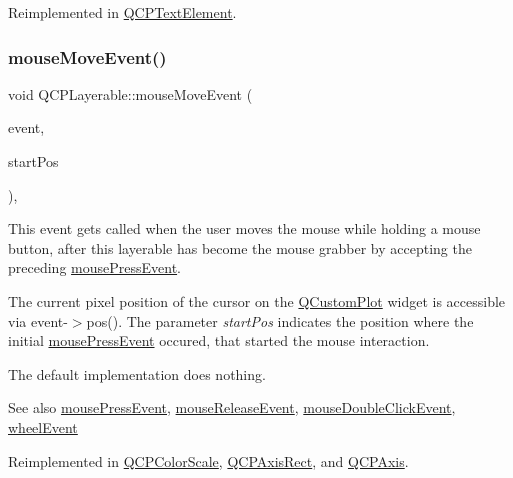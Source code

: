 Reimplemented in \hyperlink{classQCPTextElement_a2272ff775ab385f612e9fd39773de7c0}{Q\+C\+P\+Text\+Element}.

\mbox{\label{classQCPLayerable_a9eee1ba47fd69be111059ca3881933e4}} 
\subsubsection{\texorpdfstring{mouse\+Move\+Event()}{mouseMoveEvent()}}
{\footnotesize\ttfamily void Q\+C\+P\+Layerable\+::mouse\+Move\+Event (\begin{DoxyParamCaption}\item[{Q\+Mouse\+Event $\ast$}]{event,  }\item[{const Q\+PointF \&}]{start\+Pos }\end{DoxyParamCaption})\hspace{0.3cm}{\ttfamily [protected]}, {\ttfamily [virtual]}}

This event gets called when the user moves the mouse while holding a mouse button, after this layerable has become the mouse grabber by accepting the preceding \hyperlink{classQCPLayerable_af6567604818db90f4fd52822f8bc8376}{mouse\+Press\+Event}.

The current pixel position of the cursor on the \hyperlink{classQCustomPlot}{Q\+Custom\+Plot} widget is accessible via {\ttfamily event-\/$>$pos()}. The parameter {\itshape start\+Pos} indicates the position where the initial \hyperlink{classQCPLayerable_af6567604818db90f4fd52822f8bc8376}{mouse\+Press\+Event} occured, that started the mouse interaction.

The default implementation does nothing.

\begin{DoxySeeAlso}{See also}
\hyperlink{classQCPLayerable_af6567604818db90f4fd52822f8bc8376}{mouse\+Press\+Event}, \hyperlink{classQCPLayerable_aa0d79b005686f668622bbe66ac03ba2c}{mouse\+Release\+Event}, \hyperlink{classQCPLayerable_a4171e2e823aca242dd0279f00ed2de81}{mouse\+Double\+Click\+Event}, \hyperlink{classQCPLayerable_a47dfd7b8fd99c08ca54e09c362b6f022}{wheel\+Event} 
\end{DoxySeeAlso}


Reimplemented in \hyperlink{classQCPColorScale_a3b2bd79725aefaf2630fc76e90939442}{Q\+C\+P\+Color\+Scale}, \hyperlink{classQCPAxisRect_a9cd27ad8c5cfb49aefd9dbb30def4beb}{Q\+C\+P\+Axis\+Rect}, and \hyperlink{classQCPAxis_ac5a269609e6177737faabdc46434d8c7}{Q\+C\+P\+Axis}.


